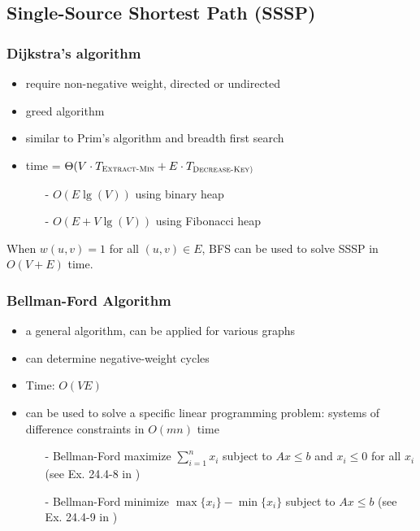\documentclass[12pt]{article}
\begin{document}
\subsection{Single-Source Shortest Path (SSSP)}

\subsubsection{Dijkstra's algorithm}

\begin{itemize}
    \item require non-negative weight, directed or undirected
    \item greed algorithm
    \item similar to Prim's algorithm and breadth first search
    \item time = $\Theta(V\cdot T_{\textnormal{\scshape Extract-Min}} + E\cdot
            T_{\textnormal{\scshape Decrease-Key)}}$
        \begin{itemize}
            \item[-] $O(E\lg(V))$ using binary heap
            \item[-] $O(E+V\lg(V))$ using Fibonacci heap
        \end{itemize}
\end{itemize}

When $w(u, v) = 1$ for all $(u,v) \in E$, BFS can be used to solve SSSP in
$O(V+E)$ time.

\subsubsection{Bellman-Ford Algorithm}

\begin{itemize}
    \item a general algorithm, can be applied for various graphs
    \item can determine negative-weight cycles
    \item Time: $O(VE)$
    \item can be used to solve a specific linear programming problem:
          systems of difference constraints in $O(mn)$ time
       \begin{itemize}
            \item[-] Bellman-Ford maximize $\sum_{i=1}^{n}{x_i}$ subject to
                     $Ax \leq b$ and $x_i \leq 0$ for all $x_i$ (see Ex. 24.4-8 in
                     \cite{clrs2})
            \item[-] Bellman-Ford minimize $\max\{x_i\}-\min\{x_i\}$ subject to
                     $Ax \leq b$ (see Ex. 24.4-9 in \cite{clrs2})
       \end{itemize}
\end{itemize}
\end{document}
